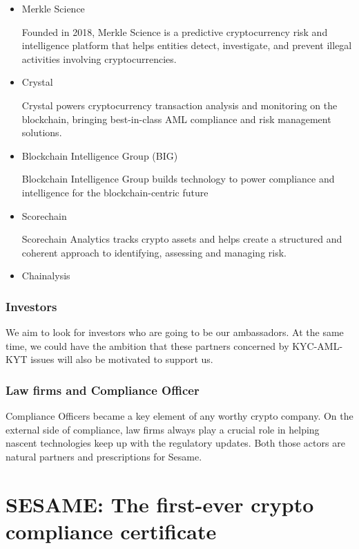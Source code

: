 ﻿\documentclass[a4paper]{article}
\begin{document}
\begin{itemize}
\item Merkle Science

Founded in 2018, Merkle Science is a predictive cryptocurrency risk and intelligence platform that helps entities detect, investigate, and prevent illegal activities involving cryptocurrencies.


\item Crystal

Crystal powers cryptocurrency transaction analysis and monitoring on the blockchain, bringing best-in-class AML compliance and risk management solutions.


\item Blockchain Intelligence Group (BIG)

Blockchain Intelligence Group builds technology to power compliance and intelligence for the blockchain-centric future


\item Scorechain

Scorechain Analytics tracks crypto assets and helps create a structured and coherent approach to identifying, assessing and managing risk. 


\item Chainalysis

\end{itemize}


\subsubsection{Investors}
We aim to look for investors who are going to be our ambassadors. At the same time, we could have the ambition that these partners concerned by KYC-AML-KYT issues will also be motivated to support us. 


\subsubsection{Law firms and Compliance Officer}
Compliance Officers became a key element of any worthy crypto company. On the external side of compliance, law firms always play a crucial role in helping nascent technologies keep up with the regulatory updates. Both those actors are natural partners and prescriptions for Sesame.

\section{SESAME: The first-ever crypto compliance certificate}
\end{document}
